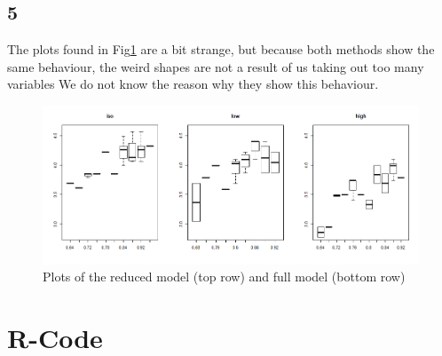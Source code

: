 \documentclass{article}
\begin{document}
    \subsection*{5}
      The plots found in Fig\ref{fig:3_5} are a bit strange, but because both methods show the same behaviour, the weird shapes are not a result of us taking out too many variables
      We do not know the reason why they show this behaviour.

      \begin{figure}[H]
          \centering
          \includegraphics[scale=0.3]{../results/diffThoraxActivity.png}
          \caption{Plots of the reduced model (top row) and full model (bottom row)}
          \label{fig:3_5}
      \end{figure}
    
  \section{R-Code}
\end{document}
